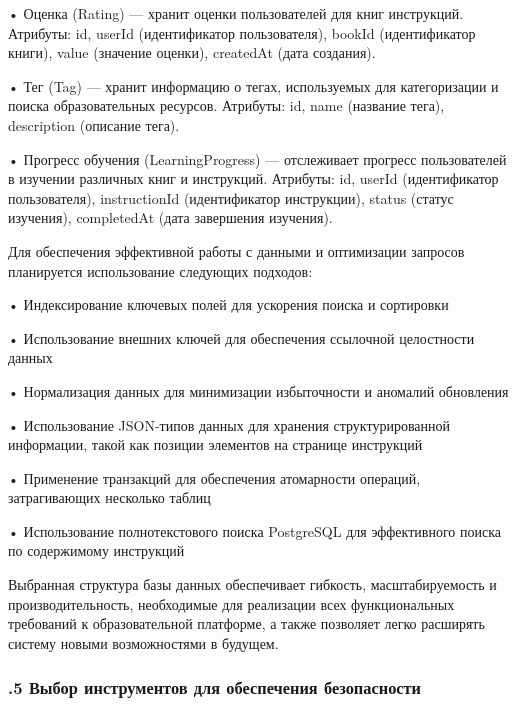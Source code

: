 {  \par \redline • Оценка (Rating) — хранит оценки пользователей для книг инструкций. Атрибуты: id, userId (идентификатор пользователя), bookId (идентификатор книги), value (значение оценки), createdAt (дата создания).
  
  \par \redline • Тег (Tag) — хранит информацию о тегах, используемых для категоризации и поиска образовательных ресурсов. Атрибуты: id, name (название тега), description (описание тега).
  
  \par \redline • Прогресс обучения (LearningProgress) — отслеживает прогресс пользователей в изучении различных книг и инструкций. Атрибуты: id, userId (идентификатор пользователя), instructionId (идентификатор инструкции), status (статус изучения), completedAt (дата завершения изучения).

  \par \redline Для обеспечения эффективной работы с данными и оптимизации запросов планируется использование следующих подходов:

  \par \redline • Индексирование ключевых полей для ускорения поиска и сортировки
  \par \redline • Использование внешних ключей для обеспечения ссылочной целостности данных
  \par \redline • Нормализация данных для минимизации избыточности и аномалий обновления
  \par \redline • Использование JSON-типов данных для хранения структурированной информации, такой как позиции элементов на странице инструкций
  \par \redline • Применение транзакций для обеспечения атомарности операций, затрагивающих несколько таблиц
  \par \redline • Использование полнотекстового поиска PostgreSQL для эффективного поиска по содержимому инструкций

  \par \redline Выбранная структура базы данных обеспечивает гибкость, масштабируемость и производительность, необходимые для реализации всех функциональных требований к образовательной платформе, а также позволяет легко расширять систему новыми возможностями в будущем.

  \par
}

\subtitlespace

\subsubsection*{ 
  \gostTitleFont
  .5 Выбор инструментов для обеспечения безопасности
} 


